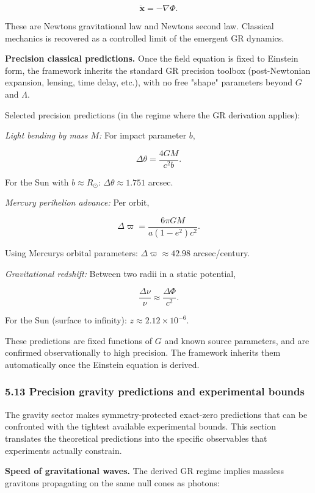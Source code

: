 \[
\ddot{\mathbf{x}} = -\nabla \Phi.
\]

These are Newton\textquotesingle s gravitational law and Newton\textquotesingle s second law. Classical mechanics is recovered as a controlled limit of the emergent GR dynamics.

\textbf{Precision classical predictions.} Once the field equation is fixed to Einstein form, the framework inherits the standard GR precision toolbox (post-Newtonian expansion, lensing, time delay, etc.), with no free "shape" parameters beyond \(G\) and \(\Lambda\).

Selected precision predictions (in the regime where the GR derivation applies):

\emph{Light bending by mass \(M\):} For impact parameter \(b\),

\[
\Delta\theta = \frac{4GM}{c^2 b}.
\]

For the Sun with \(b \approx R_\odot\): \(\Delta\theta \approx 1.751\) arcsec.

\emph{Mercury perihelion advance:} Per orbit,

\[
\Delta\varpi = \frac{6\pi GM}{a(1-e^2)c^2}.
\]

Using Mercury\textquotesingle s orbital parameters: \(\Delta\varpi \approx 42.98\) arcsec/century.

\emph{Gravitational redshift:} Between two radii in a static potential,

\[
\frac{\Delta\nu}{\nu} \approx \frac{\Delta\Phi}{c^2}.
\]

For the Sun (surface to infinity): \(z \approx 2.12 \times 10^{-6}\).

These predictions are fixed functions of \(G\) and known source parameters, and are confirmed observationally to high precision. The framework inherits them automatically once the Einstein equation is derived.

\subsubsection{5.13 Precision gravity predictions and experimental bounds}\label{513-precision-gravity-predictions-and-experimental-bounds}

The gravity sector makes symmetry-protected exact-zero predictions that can be confronted with the tightest available experimental bounds. This section translates the theoretical predictions into the specific observables that experiments actually constrain.

\textbf{Speed of gravitational waves.} The derived GR regime implies massless gravitons propagating on the same null cones as photons:

